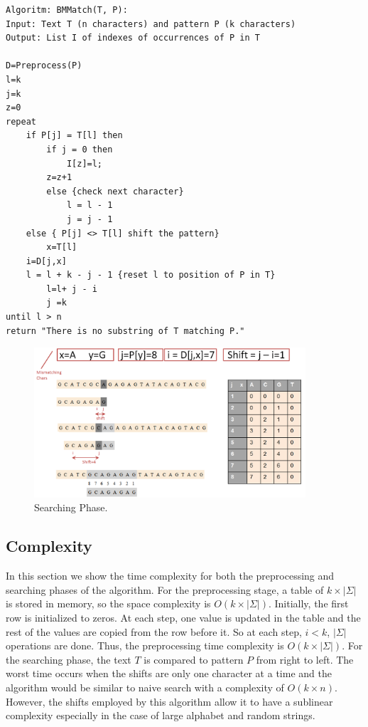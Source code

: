 \documentclass[paper=a4, fontsize=11pt]{scrartcl} %
\numberwithin{equation}{section} %
\numberwithin{figure}{section} %
\numberwithin{table}{section} %
\begin{document}
\begin{lstlisting}
Algoritm: BMMatch(T, P):
Input: Text T (n characters) and pattern P (k characters)
Output: List I of indexes of occurrences of P in T

D=Preprocess(P)
l=k
j=k
z=0
repeat
    if P[j] = T[l] then
        if j = 0 then
            I[z]=l;
	    z=z+1
        else {check next character}
            l = l - 1
            j = j - 1
    else { P[j] <> T[l] shift the pattern}
        x=T[l]
	i=D[j,x]
	l = l + k - j - 1 {reset l to position of P in T}
        l=l+ j - i
        j =k
until l > n
return "There is no substring of T matching P."
\end{lstlisting}

\begin{figure}[h!]
\centering
\includegraphics[width=0.9\textwidth]{figures/searching_phase.png}
\caption{Searching Phase.}
\label{fig:search}
\end{figure}

\subsection{Complexity}
In this section we show the time complexity for both the preprocessing and searching phases of the algorithm. For the preprocessing stage, a table of $k\times|\Sigma|$ is stored in memory, so the space complexity is $O(k\times|\Sigma|)$. Initially, the first row is initialized to zeros. At each step, one value is updated in the table and the rest of the values are copied from the row before it. So at each step, $i<k$, $|\Sigma|$ operations are done. Thus, the preprocessing time complexity is $O(k\times|\Sigma|)$. For the searching phase, the text $T$ is compared to pattern $P$ from right to left. The worst time occurs when the shifts are only one character at a time and the algorithm would be similar to naive search with a complexity of $O(k\times n)$. However, the shifts employed by this algorithm allow it to have a sublinear complexity especially in the case of large alphabet and random strings.
\end{document}

